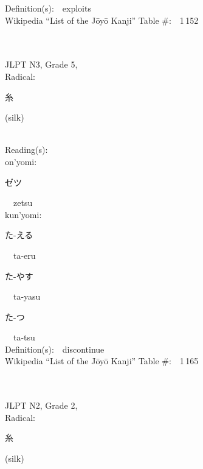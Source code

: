 \begin{multicols}{2}
Definition(s):\ \ exploits \\
Wikipedia ``List of the J\=oy\=o Kanji'' Table \#:\ \ 1\,152 \\
\ \ \\
{\fontsize{34pt}{40pt}  }\ \ \\  %
{JLPT N3, Grade 5, \\Radical:\ \ {\begin{CJK}{UTF8}{min} 糸 \end{CJK}} (silk) } \\
Reading(s):\ \ \\
{\hspace*{1em}}on'yomi:\ \ \\
{\hspace*{2em}}{\begin{CJK}{UTF8}{min} ゼツ \end{CJK}}\ \ zetsu\ \ \\
{\hspace*{1em}}kun'yomi:\ \ \\
{\hspace*{2em}}{\begin{CJK}{UTF8}{min} た-える \end{CJK}}\ \ ta-eru\ \ \\
{\hspace*{2em}}{\begin{CJK}{UTF8}{min} た-やす \end{CJK}}\ \ ta-yasu\ \ \\
{\hspace*{2em}}{\begin{CJK}{UTF8}{min} た-つ \end{CJK}}\ \ ta-tsu\ \ \\
Definition(s):\ \ discontinue \\
Wikipedia ``List of the J\=oy\=o Kanji'' Table \#:\ \ 1\,165 \\
\ \ \\
{\fontsize{34pt}{40pt}  }\ \ \\  %
{JLPT N2, Grade 2, \\Radical:\ \ {\begin{CJK}{UTF8}{min} 糸 \end{CJK}} (silk) } \\

\end{multicols}
